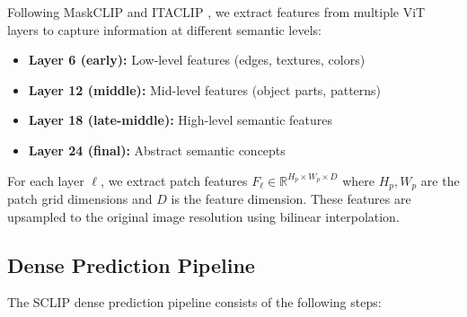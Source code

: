 Following MaskCLIP \cite{zhou2022extract} and ITACLIP \cite{shao2024itaclip}, we extract features from multiple ViT layers to capture information at different semantic levels:

\begin{itemize}
    \item \textbf{Layer 6 (early):} Low-level features (edges, textures, colors)
    \item \textbf{Layer 12 (middle):} Mid-level features (object parts, patterns)
    \item \textbf{Layer 18 (late-middle):} High-level semantic features
    \item \textbf{Layer 24 (final):} Abstract semantic concepts
\end{itemize}

For each layer $\ell$, we extract patch features $F_\ell \in \mathbb{R}^{H_p \times W_p \times D}$ where $H_p, W_p$ are the patch grid dimensions and $D$ is the feature dimension. These features are upsampled to the original image resolution using bilinear interpolation.

\subsection{Dense Prediction Pipeline}

The SCLIP dense prediction pipeline consists of the following steps:

